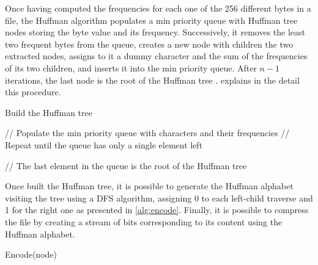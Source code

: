 Once having computed the frequencies for each one of the 256 different bytes in a file, the Huffman algorithm populates a min priority queue with Huffman tree nodes storing the byte value and its frequency. Successively, it removes the least two frequent bytes from the queue, creates a new node with children the two extracted nodes, assigns to it a dummy character and the sum of the frequencies of its two children, and inserts it into the min priority queue. After \(n-1\) iterations, the last node is the root of the Huffman tree \cite{bertossi2010algoritmi}.  explains in the detail this procedure.
\begin{algorithm}
    \caption{Build the Huffman tree}\label{alg:buildtree}

    \SetKwFor{}{}{}{}

    // Populate the min priority queue with characters and their frequencies\;
    // Repeat until the queue has only a single element left\;

    // The last element in the queue is the root of the Huffman tree\;
    \;
\end{algorithm}

Once built the Huffman tree, it is possible to generate the Huffman alphabet visiting the tree using a DFS algorithm, assigning 0 to each left-child traverse and 1 for the right one as presented in \cref{alg:encode}. Finally, it is possible to compress the file by creating a stream of bits corresponding to its content using the Huffman alphabet.

\begin{algorithm}
    \caption{Encode(node)}\label{alg:encode}
\end{algorithm}

